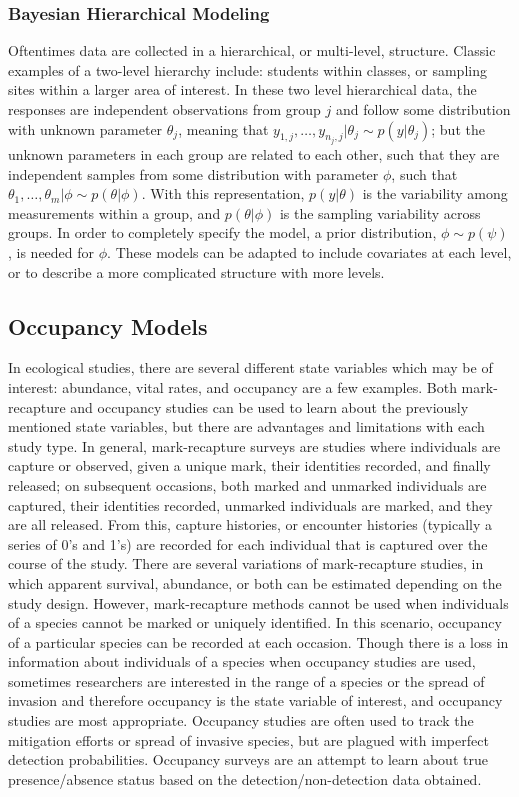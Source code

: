 \documentclass[12pt]{article}\usepackage[]{graphicx}\usepackage[]{color}
\begin{document}
\subsubsection{Bayesian Hierarchical Modeling}

Oftentimes data are collected in a hierarchical, or multi-level, structure. Classic examples of a two-level hierarchy include: students within classes, or sampling sites within a larger area of interest. In these two level hierarchical data, the responses are independent observations from group $j$ and follow some distribution with unknown parameter $\theta_j$, meaning that $y_{1, j}, \dots, y_{n_j, j}|\theta_j \sim p(y|\theta_j)$; but the unknown parameters in each group are related to each other, such that they are independent samples from some distribution with parameter $\phi$, such that $\theta_1, \dots, \theta_m|\phi \sim p(\theta|\phi)$. With this representation, $p(y|\theta)$ is the variability among measurements within a group, and $p(\theta|\phi)$ is the sampling variability across groups. In order to completely specify the model, a prior distribution, $\phi \sim p(\psi)$, is needed for $\phi$. These models can be adapted to include covariates at each level, or to describe a more complicated structure with more levels. 

\subsection{Occupancy Models}

In ecological studies, there are several different state variables which may be of interest: abundance, vital rates, and occupancy are a few examples. Both mark-recapture and occupancy studies can be used to learn about the previously mentioned state variables, but there are advantages and limitations with each study type. In general, mark-recapture surveys are studies where individuals are capture or observed, given a unique mark, their identities recorded, and finally released; on subsequent occasions, both marked and unmarked individuals are captured, their identities recorded, unmarked individuals are marked, and they are all released. From this, capture histories, or encounter histories (typically a series of 0's and 1's) are recorded for each individual that is captured over the course of the study. There are several variations of mark-recapture studies, in which apparent survival, abundance, or both can be estimated depending on the study design. However, mark-recapture methods cannot be used when individuals of a species cannot be marked or uniquely identified. In this scenario, occupancy of a particular species can be recorded at each occasion. Though there is a loss in information about individuals of a species when occupancy studies are used, sometimes researchers are interested in the range of a species or the spread of invasion and therefore occupancy is the state variable of interest, and occupancy studies are most appropriate. Occupancy studies are often used to track the mitigation efforts or spread of invasive species, but are plagued with imperfect detection probabilities. Occupancy surveys are an attempt to learn about true presence/absence status based on the detection/non-detection data obtained.  
\end{document}
